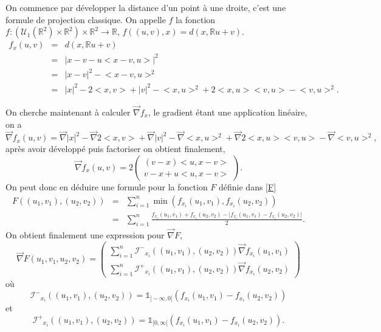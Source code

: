 \documentclass[a4paper,11pt]{article}
\numberwithin{equation}{section}
\begin{document}
On commence par développer la distance d'un point à une droite, c'est une formule de projection classique. On appelle $f$ la fonction $f:(\mathcal{U}_1(\mathbb{R}^2)\times\mathbb{R}^2) \times \mathbb{R}^2 \to \mathbb{R}$, $f((u,v),x)=d(x,\mathbb{R}u+v)$.
\begin{equation}
	\begin{array}{ccc}
		f_x(u,v)&=&d(x,\mathbb{R}u+v)\\
		&=& \big|x-v-u\big<x-v , u\big> \big|^2\\
		&=& \big|x-v\big|^2 -\big<x-v, u\big>^2\\
		&=& \big|x\big|^2-2\big<x,v\big>+\big|v\big|^2 -\big<x, u\big>^2+ 2\big<x, u\big>\big<v, u\big>- \big<v, u\big>^2.
	\end{array}
\end{equation}

On cherche maintenant à calculer $\overrightarrow{\nabla} f_x$, le gradient étant une application linéaire, on a  
\[\overrightarrow{\nabla} f_x (u,v)= \overrightarrow{\nabla}\big|x\big|^2-\overrightarrow{\nabla}2\big<x,v\big>+\overrightarrow{\nabla}\big|v\big|^2 -\overrightarrow{\nabla}\big<x, u\big>^2+ \overrightarrow{\nabla}2\big<x, u\big>\big<v, u\big>- \overrightarrow{\nabla}\big<v, u\big>^2,\]
après avoir développé puis factoriser on obtient finalement, 
\begin{equation}
	\overrightarrow{\nabla} f_x (u,v)=2
	\begin{pmatrix}
		(v-x)\big<u,x-v\big>\\
		v-x+u\big<u,x-v\big>
	\end{pmatrix}.
\end{equation}
On peut donc en déduire une formule pour la fonction $F$ définie dans \eqref{F}
\begin{equation}
	\begin{array}{ccc}
		F((u_1,v_1), (u_2,v_2))&=& \sum_{i=1}^{n}\min (f_{x_i}(u_1,v_1) ,f_{x_i}(u_2,v_2) )\\
		&=& \sum_{i=1}^{n} \frac{f_{x_i}(u_1,v_1)+f_{x_i}(u_2,v_2) -\big|f_{x_i}(u_1,v_1)- f_{x_i}(u_2,v_2) \big| }{2}.
	\end{array}
\end{equation}
On obtient finalement une expression pour $\overrightarrow{\nabla} F$, 
\begin{equation}
	\overrightarrow{\nabla} F(u_1,v_1, u_2,v_2)=
	\begin{pmatrix}
		\sum_{i=1}^{n}\mathcal{I^{-}}_{x_i}((u_1,v_1),(u_2,v_2))\overrightarrow{\nabla}f_{x_i} (u_1,v_1)\\
		\sum_{i=1}^{n}\mathcal{I^{+}}_{x_i}((u_1,v_1),(u_2,v_2))\overrightarrow{\nabla}f_{x_i} (u_2,v_2)
	\end{pmatrix}
\end{equation}
où \[\mathcal{I^{-}}_{x_i}((u_1,v_1),(u_2,v_2))=\mathds{1}_{]-\infty,0]}(f_{x_i}(u_1,v_1)- f_{x_i}(u_2,v_2))\] et \[\mathcal{I^{+}}_{x_i}((u_1,v_1),(u_2,v_2))=\mathds{1}_{[0,\infty[}(f_{x_i}(u_1,v_1)- f_{x_i}(u_2,v_2)).\]
\end{document}
